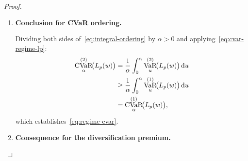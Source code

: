 \documentclass[12pt,openany]{book}
\newcommand{\bfw}{\mathbf{w}}
\DeclareMathOperator{\CVaR}{CVaR}
\DeclareMathOperator{\VaR}{VaR}
\numberwithin{equation}{chapter}
\theoremstyle{plain}
\theoremstyle{definition}
\theoremstyle{remark}
\def\bfw{w}%
\begin{document}
\begin{proof}
\begin{enumerate}[label=\textbf{Step \arabic*.}, leftmargin=*,
                  widest=Step 5., itemsep=1ex]
  \item \textbf{Conclusion for CVaR ordering.}

        Dividing both sides of~\eqref{eq:integral-ordering} by
        $\alpha > 0$ and applying~\eqref{eq:cvar-regime-lp}:
        \begin{align}
          \CVaR_\alpha^{(2)}\!\bigl(L_p(\bfw)\bigr)
          &= \frac{1}{\alpha}
             \int_0^\alpha
             \VaR_u^{(2)}\!\bigl(L_p(\bfw)\bigr)\,\mathrm{d}u
          \notag \\
          &\geq \frac{1}{\alpha}
             \int_0^\alpha
             \VaR_u^{(1)}\!\bigl(L_p(\bfw)\bigr)\,\mathrm{d}u
          \notag \\
          &= \CVaR_\alpha^{(1)}\!\bigl(L_p(\bfw)\bigr),
          \label{eq:regime-cvar-proof}
        \end{align}
        which establishes~\eqref{eq:regime-cvar}.

  \item \textbf{Consequence for the diversification premium.}


\end{enumerate}
\end{proof}
\end{document}
